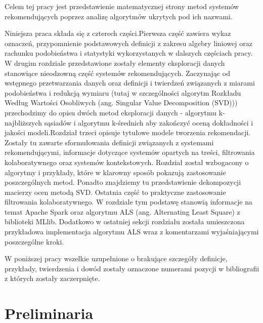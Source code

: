 \documentclass[12pt,a4paper]{report}
\begin{document}
Celem tej pracy jest przedstawienie matematycznej strony metod systemów rekomendujących poprzez analizę algorytmów ukrytych pod ich nazwami.

Niniejsza praca składa się z czterech części.Pierwsza część zawiera wykaz oznaczeń, przypomnienie podstawowych definicji z zakresu algebry liniowej oraz rachunku podobieństwa i statystyki wykorzystanych w dalszych częściach pracy. W drugim rozdziale przedstawione zostały elementy eksploracji danych stanowiące nieodzowną część systemów rekomendujących. Zaczynając od wstępnego przetwarzania danych oraz definicji i twierdzeń związanych z miarami podobieństwa i redukcją wymiaru (tutaj w szczególności algorytm Rozkładu Według Wartości Osobliwych (ang. Singular Value Decomposition (SVD))) przechodzimy do opisu dwóch metod eksploracji danych - algorytmu k-najbliższych sąsiadów i algorytmu k-średnich aby zakończyć oceną dokładności i jakości modeli.Rozdział trzeci opisuje tytułowe modele tworzenia rekomendacji. Zostały tu zawarte sformułowania definicji związanych z systemami rekomendującymi, informacje dotyczące systemów opartych na treści, filtrowania kolaboratywnego oraz systemów kontekstowych. Rozdział został wzbogacony o algorytmy i przykłady, które w klarowny sposób pokazują zastosowanie poszczególnych metod. Ponadto znajdziemy tu przedstawienie dekompozycji macierzy ocen metodą SVD. Ostatnia część to praktyczne zastosowanie filtrowania kolaboratywnego. W rozdziale tym podstawę stanowią informacje na temat Apache Spark oraz algorytmu ALS (ang. Alternating Least Square) z biblioteki MLlib. Dodatkowo w ostatniej sekcji rozdziału została umieszczona przykładowa implementacja algorytmu ALS wraz z komentarzami wyjaśniającymi poszczególne kroki. 

W poniższej pracy wszelkie uzupełnione o brakujące szczegóły definicje, przykłady, twierdzenia i dowód zostały oznaczone numerami pozycji w bibliografii z których zostały zaczerpnięte.


\chapter{Preliminaria} %
\end{document}
